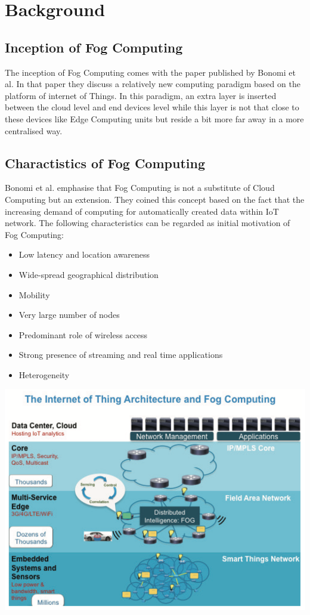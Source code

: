 \chapter{Background} \label{chap:litreview}

\section{Inception of Fog Computing}
The inception of Fog Computing comes with the paper published by Bonomi et al. In that paper they discuss a relatively new computing paradigm based on the platform of internet of Things. In this paradigm, an extra layer is inserted between the cloud level and end devices level while this layer is not that close to these devices like Edge Computing units but reside a bit more far away in a more centralised way.  \cite{roman2018mobile} 

\section{Charactistics of Fog Computing}
Bonomi et al. emphasise that Fog Computing is not a substitute of Cloud Computing but an extension. They coined this concept based on the fact that the increasing demand of computing for automatically created data within IoT network. The following characteristics can be regarded as initial motivation of Fog Computing\cite{bonomi2012fog}:
\begin{itemize}
    \item Low latency and location awareness
    \item Wide-spread geographical distribution
    \item Mobility
    \item Very large number of nodes
    \item Predominant role of wireless access
    \item Strong presence of streaming and real time applications
    \item Heterogeneity
\end{itemize}

\includegraphics[width=\textwidth]{images/the_internet_of_thing_architecture_and_fog_computing.png}

